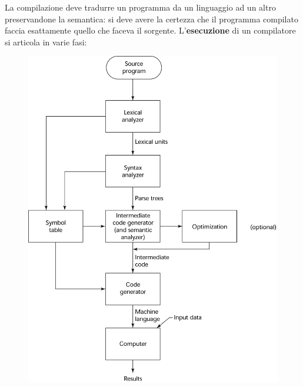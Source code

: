 \documentclass[a4paper]{article}
\begin{document}
	La compilazione deve tradurre un programma da un linguaggio ad un altro preservandone la semantica: si deve avere la certezza che il programma compilato faccia esattamente quello che faceva il sorgente. L'\textcolor{Red3}{\textbf{esecuzione}} di un compilatore si articola in varie fasi:
	\begin{figure}[!htp]
		\centering
		\includegraphics[width=.85\textwidth]{img/fasi_compilatore.png}
	\end{figure}
	
\end{document}
